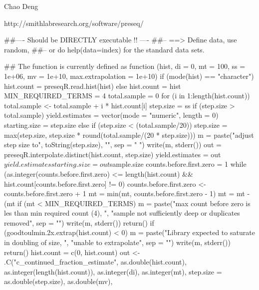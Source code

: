 \documentclass[letterpaper]{book}
\begin{document}
%
\begin{Author}\relax
Chao Deng
\end{Author}
%
\begin{References}\relax
http://smithlabresearch.org/software/preseq/
\end{References}
%
\begin{Examples}
\begin{ExampleCode}
##---- Should be DIRECTLY executable !! ----
##-- ==>  Define data, use random,
##--	or do  help(data=index)  for the standard data sets.

## The function is currently defined as
function (hist, di = 0, mt = 100, ss = 1e+06, mv = 1e+10, max.extrapolation = 1e+10) 
{
    if (mode(hist) == "character") {
        hist.count = preseqR.read.hist(hist)
    }
    else {
        hist.count = hist
    }
    MIN_REQUIRED_TERMS = 4
    total.sample = 0
    for (i in 1:length(hist.count)) total.sample <- total.sample + 
        i * hist.count[i]
    step.size = ss
    if (step.size > total.sample) {
        yield.estimates = vector(mode = "numeric", length = 0)
        starting.size = step.size
    }
    else {
        if (step.size < (total.sample/20)) {
            step.size = max(step.size, step.size * round(total.sample/(20 * 
                step.size)))
            m = paste("adjust step size to", toString(step.size), 
                "\n", sep = " ")
            write(m, stderr())
        }
        out = preseqR.interpolate.distinct(hist.count, step.size)
        yield.estimates = out$yield.estimates
        starting.size = out$sample.size
    }
    counts.before.first.zero = 1
    while (as.integer(counts.before.first.zero) <= length(hist.count) && 
        hist.count[counts.before.first.zero] != 0) 
		counts.before.first.zero <- counts.before.first.zero + 1
    mt = min(mt, counts.before.first.zero - 1)
    mt = mt - (mt%
    if (mt < MIN_REQUIRED_TERMS) {
        m = paste("max count before zero is les than min required count (4), ", 
            "sample not sufficiently deep or duplicates removed", 
            sep = "")
        write(m, stderr())
        return()
    }
    if (goodtoulmin.2x.extrap(hist.count) < 0) {
        m = paste("Library expected to saturate in doubling of size, ", 
            "unable to extrapolate", sep = "")
        write(m, stderr())
        return()
    }
    hist.count = c(0, hist.count)
    out <- .C("c_continued_fraction_estimate", as.double(hist.count), 
        as.integer(length(hist.count)), as.integer(di), as.integer(mt), 
        step.size = as.double(step.size), as.double(mv), 
}
\end{ExampleCode}
\end{Examples}
\end{document}
